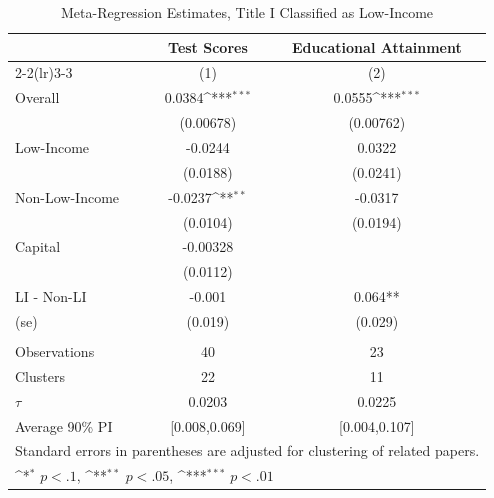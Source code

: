 \begin{table}[htbp]\centering
\def\sym#1{\ifmmode^{#1}\else\(^{#1}\)\fi}
\caption{Meta-Regression Estimates, Title I Classified as Low-Income \label{tab:TitleILIregs}}
\begin{tabular}{l*{2}{c}}
\hline\hline
                    &\multicolumn{1}{c}{Test Scores}&\multicolumn{1}{c}{Educational Attainment}\\\cmidrule(lr){2-2}\cmidrule(lr){3-3}
                    &\multicolumn{1}{c}{(1)}         &\multicolumn{1}{c}{(2)}         \\
\hline
Overall             &      0.0384\sym{***}&      0.0555\sym{***}\\
                    &   (0.00678)         &   (0.00762)         \\
Low-Income          &     -0.0244         &      0.0322         \\
                    &    (0.0188)         &    (0.0241)         \\
Non-Low-Income      &     -0.0237\sym{**} &     -0.0317         \\
                    &    (0.0104)         &    (0.0194)         \\
Capital             &    -0.00328         &                     \\
                    &    (0.0112)         &                     \\
\hline
LI - Non-LI         &      -0.001         &     0.064**         \\
(se)                &     (0.019)         &     (0.029)         \\
\hline              &                     &                     \\
Observations        &          40         &          23         \\
Clusters            &          22         &          11         \\
$\tau$              &      0.0203         &      0.0225         \\
Average 90\% PI     &[0.008,0.069]         &[0.004,0.107]         \\
\hline\hline
\multicolumn{3}{l}{\footnotesize Standard errors in parentheses are adjusted for clustering of related papers.}\\
\multicolumn{3}{l}{\footnotesize \footnotesize \sym{*} \(p<.1\), \sym{**} \(p<.05\), \sym{***} \(p<.01\)}\\
\end{tabular}
\end{table}
